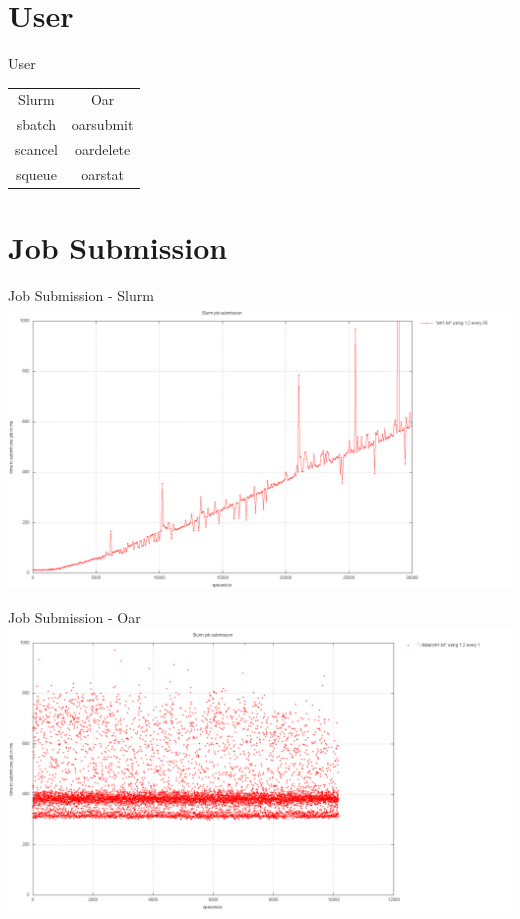 \documentclass[10pt,utf8]{beamer}
\begin{document}
\section{User}
\begin{frame}{User}
    \begin{tabular}{c c}
          Slurm & Oar \\
          sbatch & oarsubmit \\
          scancel & oardelete \\
          squeue & oarstat \\
    \end{tabular}
\end{frame}

\section{Job Submission}
\begin{frame}{Job Submission - Slurm}
	\includegraphics[scale=0.22, keepaspectratio]{../output/pics/slurm.png}
\end{frame}

\begin{frame}{Job Submission - Oar}
	\includegraphics[scale=0.22, keepaspectratio]{../output/pics/oar.png}
\end{frame}
\end{document}
